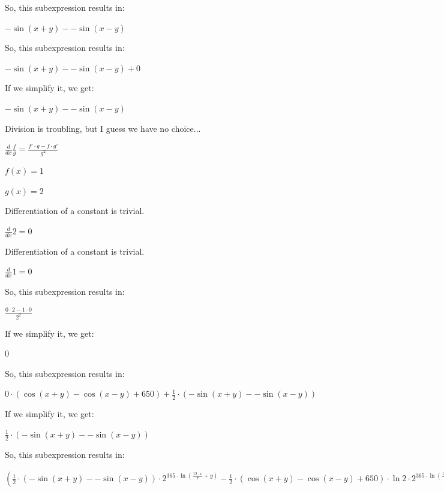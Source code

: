 \documentclass[12pt]{article}
\begin{document}
\begin{fleqn}[\parindent]
So, this subexpression results in:\par
$ - \sin ( x  +  y ) - - \sin ( x  -  y ) $\par
So, this subexpression results in:\par
$ - \sin ( x  +  y ) - - \sin ( x  -  y ) +  0  $\par
If we simplify it, we get:\par
$ - \sin ( x  +  y ) - - \sin ( x  -  y ) $\par
Division is troubling, but I guess we have no choice...\par
$ \frac{d}{dx} \frac{f}{g} = \frac{f' \cdot g - f \cdot g'}{g^2} $\par
$ f(x) =  1  $\par
$ g(x) =  2  $\par
Differentiation of a constant is trivial.\par
$ \frac{d}{dx} 2 = 0 $\par
Differentiation of a constant is trivial.\par
$ \frac{d}{dx} 1 = 0 $\par
So, this subexpression results in:\par
$ \frac{ 0  \cdot  2  -  1  \cdot  0 }{{ 2 }^{ 2 }} $\par
If we simplify it, we get:\par
$  0  $\par
So, this subexpression results in:\par
$  0  \cdot (\cos ( x  +  y ) - \cos ( x  -  y ) +  650 ) + \frac{ 1 }{ 2 } \cdot (- \sin ( x  +  y ) - - \sin ( x  -  y )) $\par
If we simplify it, we get:\par
$ \frac{ 1 }{ 2 } \cdot (- \sin ( x  +  y ) - - \sin ( x  -  y )) $\par
So, this subexpression results in:\par
$ (\frac{ 1 }{ 2 } \cdot (- \sin ( x  +  y ) - - \sin ( x  -  y )) \cdot { 2 }^{ 365  \cdot \ln (\frac{ 12  \cdot  x }{ 7 } +  y )} - \frac{ 1 }{ 2 } \cdot (\cos ( x  +  y ) - \cos ( x  -  y ) +  650 ) \cdot \ln  2  \cdot { 2 }^{ 365  \cdot \ln (\frac{ 12  \cdot  x }{ 7 } +  y )} \cdot  365  \cdot \frac{\frac{ 84 }{ 49 }}{\frac{ 12  \cdot  x }{ 7 } +  y }) \div ({({ 2 }^{ 365  \cdot \ln (\frac{ 12  \cdot  x }{ 7 } +  y )})}^{ 2 }) $\par

\end{fleqn}
\end{document}
